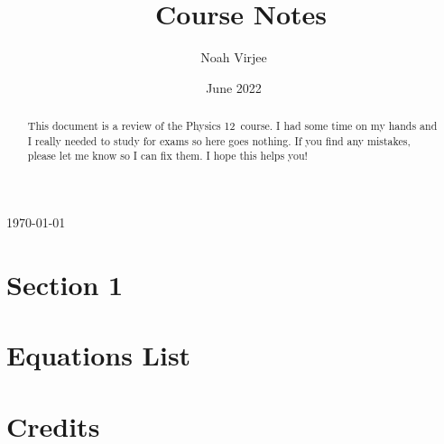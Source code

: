\documentclass{article}
\title{\code\ Course Notes}
\author{Noah Virjee}
\date{June 2022}
\newcommand{\name}{Physics 12}
\begin{document}
\noindent\parbox{\linewidth}{ %
\parbox{.7\linewidth}{\fontsize{24}{28}\selectfont\thetitle}\hfill%
\parbox{.3\linewidth}{\fontsize{12}{14}\selectfont\raggedleft\today\\\theauthor%
}}

\begin{abstract}
This document is a review of the \name\ course. I had some time on my hands and I really needed to study for exams so here goes nothing. If you find any mistakes, please let me know so I can fix them. I hope this helps you!
\end{abstract}

\tableofcontents
\pagebreak

\section{Section 1}

\pagebreak
\appendix
\section{Equations List}


\pagebreak
\section{Credits}
\end{document}
